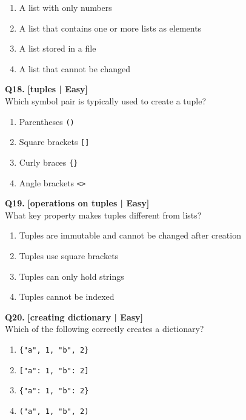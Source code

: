 \begin{enumerate}[label=(\alph*),topsep=2pt,itemsep=1pt,partopsep=0pt,parsep=0pt]
    \item \relax A list with only numbers
    \item \relax A list that contains one or more lists as elements
    \item \relax A list stored in a file
    \item \relax A list that cannot be changed
\end{enumerate}
\vspace{2mm}

\noindent\textbf{Q18.} \hfill {\small\color{LPUOrange}\textbf{[tuples | Easy]}}\\[2pt]
Which symbol pair is typically used to create a tuple?

\begin{enumerate}[label=(\alph*),topsep=2pt,itemsep=1pt,partopsep=0pt,parsep=0pt]
    \item \relax Parentheses \texttt{()}
    \item \relax Square brackets \texttt{[]}
    \item \relax Curly braces \texttt{\{\}}
    \item \relax Angle brackets \texttt{<>}
\end{enumerate}
\vspace{2mm}

\noindent\textbf{Q19.} \hfill {\small\color{LPUOrange}\textbf{[operations on tuples | Easy]}}\\[2pt]
What key property makes tuples different from lists?

\begin{enumerate}[label=(\alph*),topsep=2pt,itemsep=1pt,partopsep=0pt,parsep=0pt]
    \item \relax Tuples are immutable and cannot be changed after creation
    \item \relax Tuples use square brackets
    \item \relax Tuples can only hold strings
    \item \relax Tuples cannot be indexed
\end{enumerate}
\vspace{2mm}

\noindent\textbf{Q20.} \hfill {\small\color{LPUOrange}\textbf{[creating dictionary | Easy]}}\\[2pt]
Which of the following correctly creates a dictionary?

\begin{enumerate}[label=(\alph*),topsep=2pt,itemsep=1pt,partopsep=0pt,parsep=0pt]
    \item \relax \texttt{\{"a", 1, "b", 2\}}
    \item \relax \texttt{["a": 1, "b": 2]}
    \item \relax \texttt{\{"a": 1, "b": 2\}}
    \item \relax \texttt{("a", 1, "b", 2)}
\end{enumerate}
\vspace{2mm}


